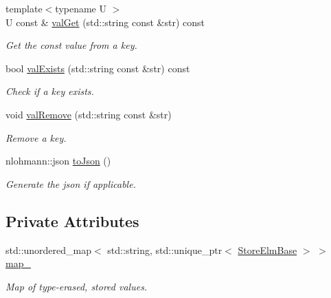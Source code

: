 \begin{DoxyCompactItemize}
{\footnotesize template$<$typename U $>$ }\\U const  \& \hyperlink{structvt_1_1vrt_1_1collection_1_1storage_1_1_storable_a5014622ff587047270462efeca4ca2dd}{val\+Get} (std\+::string const \&str) const
\begin{DoxyCompactList}\small\item\em Get the const value from a key. \end{DoxyCompactList}\item 
bool \hyperlink{structvt_1_1vrt_1_1collection_1_1storage_1_1_storable_a46884264a54e5be7fc231208dc468b8e}{val\+Exists} (std\+::string const \&str) const
\begin{DoxyCompactList}\small\item\em Check if a key exists. \end{DoxyCompactList}\item 
void \hyperlink{structvt_1_1vrt_1_1collection_1_1storage_1_1_storable_a760fb8a543d0684b259fdbf078bcafb8}{val\+Remove} (std\+::string const \&str)
\begin{DoxyCompactList}\small\item\em Remove a key. \end{DoxyCompactList}\item 
nlohmann\+::json \hyperlink{structvt_1_1vrt_1_1collection_1_1storage_1_1_storable_afc24cbef1191dfd0457575ddd28b12d9}{to\+Json} ()
\begin{DoxyCompactList}\small\item\em Generate the json if applicable. \end{DoxyCompactList}\end{DoxyCompactItemize}
\subsection*{Private Attributes}
\begin{DoxyCompactItemize}
\item 
std\+::unordered\+\_\+map$<$ std\+::string, std\+::unique\+\_\+ptr$<$ \hyperlink{structvt_1_1vrt_1_1collection_1_1storage_1_1_store_elm_base}{Store\+Elm\+Base} $>$ $>$ \hyperlink{structvt_1_1vrt_1_1collection_1_1storage_1_1_storable_ade35c0e0ef45b53ffad56cbc349cfb82}{map\+\_\+}
\begin{DoxyCompactList}\small\item\em Map of type-\/erased, stored values. \end{DoxyCompactList}\end{DoxyCompactItemize}


